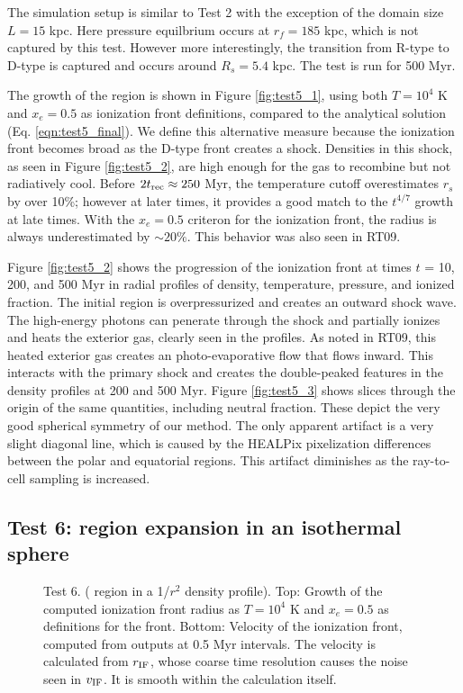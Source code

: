 \documentclass[12pt,preprint]{aastex}
\begin{document}
The simulation setup is similar to Test 2 with the exception of the
domain size $L = 15$ kpc.  Here pressure equilbrium occurs at $r_f =
185$ kpc, which is not captured by this test.  However more
interestingly, the transition from R-type to D-type is captured and
occurs around $R_s = 5.4$ kpc.  The test is run for 500 Myr.

The growth of the  region is shown in Figure
\ref{fig:test5_1}, using both $T = 10^4$ K and $x_e = 0.5$ as
ionization front definitions, compared to the analytical solution
(Eq. \ref{eqn:test5_final}).  We define this alternative measure
because the ionization front becomes broad as the D-type front creates
a shock.  Densities in this shock, as seen in Figure
\ref{fig:test5_2}, are high enough for the gas to recombine but not
radiatively cool.  Before $2t_{\rm rec} \approx 250$ Myr, the
temperature cutoff overestimates $r_s$ by over 10\%; however at later
times, it provides a good match to the $t^{4/7}$ growth at late times.
With the $x_e = 0.5$ criteron for the ionization front, the radius is
always underestimated by $\sim20\%$.  This behavior was also seen in
RT09.

Figure \ref{fig:test5_2} shows the progression of the ionization front
at times $t$ = 10, 200, and 500 Myr in radial profiles of density,
temperature, pressure, and ionized fraction.  The initial 
region is overpressurized and creates an outward shock wave.  The
high-energy photons can penerate through the shock and partially
ionizes and heats the exterior gas, clearly seen in the profiles.  As
noted in RT09, this heated exterior gas creates an photo-evaporative
flow that flows inward.  This interacts with the primary shock and
creates the double-peaked features in the density profiles at 200 and
500 Myr.  Figure \ref{fig:test5_3} shows slices through the origin of
the same quantities, including neutral fraction.  These depict the
very good spherical symmetry of our method.  The only apparent
artifact is a very slight diagonal line, which is caused by the
HEALPix pixelization differences between the polar and equatorial
regions.  This artifact diminishes as the ray-to-cell sampling is
increased.

\subsection{Test 6:  region expansion in an isothermal
  sphere}

\begin{figure}[t]
  \caption{\label{fig:test6_1} Test 6. ( region in a 1/$r^2$
    density profile).  Top: Growth of the computed ionization front
    radius as $T=10^4$ K and $x_e = 0.5$ as definitions for the front.
    Bottom: Velocity of the ionization front, computed from outputs at
    0.5 Myr intervals.  The velocity is calculated from $r_{\rm IF}$,
    whose coarse time resolution causes the noise seen in $v_{\rm
      IF}$.  It is smooth within the calculation itself.}
\end{figure}
\end{document}
